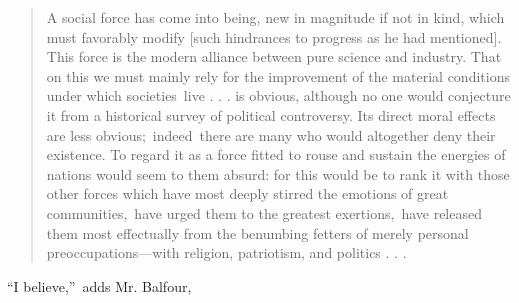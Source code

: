 \documentclass[openany,nobib]{tufte-book}
\begin{document}
\begin{quote}
A social force has come into being, new in magnitude if not in kind,
which must favorably modify {[}such hindrances to progress as he had
mentioned{]}. This force is the modern alliance between pure science and
industry. That on this we must mainly rely for the improvement of the
material conditions under which societies~live . . . is obvious,
although no one would conjecture it from a historical survey of
political controversy. Its direct moral effects are less
obvious;~indeed~there are many who would altogether deny their
existence. To regard it as a force fitted to rouse and sustain the
energies of nations would seem to them absurd: for this would be to rank
it with those other forces which have most deeply stirred the emotions
of great communities,~have urged them to the greatest exertions,~have
released them most effectually from the benumbing fetters of merely
personal preoccupations---with religion, patriotism, and politics . . .~
\end{quote}

``I believe,''~adds Mr. Balfour,~
\end{document}
